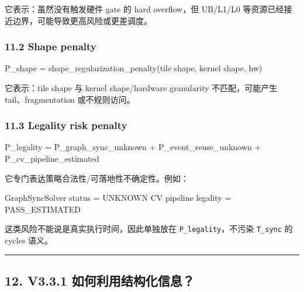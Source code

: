 \documentclass[
  10pt,
]{article}
\newenvironment{Shaded}{}{}
\newcommand{\NormalTok}[1]{#1}
\begin{document}
它表示：虽然没有触发硬件 gate 的 hard overflow，但 UB/L1/L0
等资源已经接近边界，可能导致更高风险或更差调度。

\subsubsection{11.2 Shape penalty}\label{shape-penalty}

\begin{Shaded}
\begin{Highlighting}[]
\NormalTok{P\_shape = shape\_regularization\_penalty(tile shape, kernel shape, hw)}
\end{Highlighting}
\end{Shaded}

它表示：tile shape 与 kernel shape/hardware granularity 不匹配，可能产生
tail、fragmentation 或不规则访问。

\subsubsection{11.3 Legality risk penalty}\label{legality-risk-penalty}

\begin{Shaded}
\begin{Highlighting}[]
\NormalTok{P\_legality =}
\NormalTok{    P\_graph\_sync\_unknown}
\NormalTok{  + P\_event\_reuse\_unknown}
\NormalTok{  + P\_cv\_pipeline\_estimated}
\end{Highlighting}
\end{Shaded}

它专门表达策略合法性/可落地性不确定性。例如：

\begin{Shaded}
\begin{Highlighting}[]
\NormalTok{GraphSyncSolver status = UNKNOWN}
\NormalTok{CV pipeline legality = PASS\_ESTIMATED}
\end{Highlighting}
\end{Shaded}

这类风险不能说是真实执行时间，因此单独放在 \texttt{P\_legality}，不污染
\texttt{T\_sync} 的 cycles 语义。

\begin{center}\rule{0.5\linewidth}{0.5pt}\end{center}

\subsection{12. V3.3.1
如何利用结构化信息？}\label{v3.3.1-ux5982ux4f55ux5229ux7528ux7ed3ux6784ux5316ux4fe1ux606f}
\end{document}
